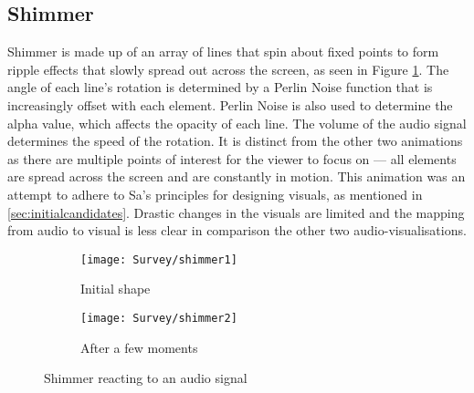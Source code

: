 \documentclass[../initial_thesis.tex]{subfiles}
\begin{document}
\subsection{Shimmer}
Shimmer is made up of an array of lines that spin about fixed points to form ripple effects that slowly spread out across the screen, as seen in Figure \ref{fig:shimmer1}. The angle of each line's rotation is determined by a Perlin Noise function that is increasingly offset with each element. Perlin Noise is also used to determine the alpha value, which affects the opacity of each line. The volume of the audio signal determines the speed of the rotation. It is distinct from the other two animations as there are multiple points of interest for the viewer to focus on --- all elements are spread across the screen and are constantly in motion. This animation was an attempt to adhere to Sa's principles for designing visuals, as mentioned in \ref{sec:initialcandidates}. Drastic changes in the visuals are limited and the mapping from audio to visual is less clear in comparison the other two audio-visualisations.

\begin{figure}
  \begin{subfigure}{0.5\textwidth}
    \texttt{[image: Survey/shimmer1]}
    \caption{Initial shape}
  \end{subfigure} 
  \begin{subfigure}{0.5\textwidth}
    \texttt{[image: Survey/shimmer2]}
    \caption{After a few moments}
  \end{subfigure}
  \caption{Shimmer reacting to an audio signal}
  \label{fig:shimmer1}
\end{figure}
\end{document}
